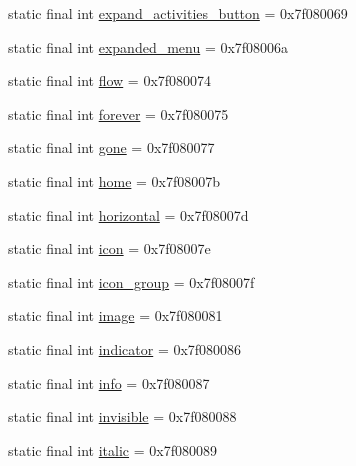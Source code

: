 \begin{DoxyCompactItemize}
\item 
static final int \mbox{\hyperlink{classcom_1_1synnapps_1_1carouselview_1_1_r_1_1id_a4d47d4d27b7335d074578066756fb00d}{expand\+\_\+activities\+\_\+button}} = 0x7f080069
\item 
static final int \mbox{\hyperlink{classcom_1_1synnapps_1_1carouselview_1_1_r_1_1id_ac9c4f64e7c18cb02dc4ba45941c9b623}{expanded\+\_\+menu}} = 0x7f08006a
\item 
static final int \mbox{\hyperlink{classcom_1_1synnapps_1_1carouselview_1_1_r_1_1id_a2fa07d38896ddef68919239827928ced}{flow}} = 0x7f080074
\item 
static final int \mbox{\hyperlink{classcom_1_1synnapps_1_1carouselview_1_1_r_1_1id_a30f5d58a35470f3a657697b440b4d1bb}{forever}} = 0x7f080075
\item 
static final int \mbox{\hyperlink{classcom_1_1synnapps_1_1carouselview_1_1_r_1_1id_a9b19a7136f32cb1525a1cabfb1a3aee2}{gone}} = 0x7f080077
\item 
static final int \mbox{\hyperlink{classcom_1_1synnapps_1_1carouselview_1_1_r_1_1id_ab6bec8184b1c5afe5d5c0dcde461e7b5}{home}} = 0x7f08007b
\item 
static final int \mbox{\hyperlink{classcom_1_1synnapps_1_1carouselview_1_1_r_1_1id_ab861d54ce3037b096e817b23cd0042d5}{horizontal}} = 0x7f08007d
\item 
static final int \mbox{\hyperlink{classcom_1_1synnapps_1_1carouselview_1_1_r_1_1id_ab3ec0640d80bfd8681719819640287bb}{icon}} = 0x7f08007e
\item 
static final int \mbox{\hyperlink{classcom_1_1synnapps_1_1carouselview_1_1_r_1_1id_a79b28693841723d9660b9c484d44eb82}{icon\+\_\+group}} = 0x7f08007f
\item 
static final int \mbox{\hyperlink{classcom_1_1synnapps_1_1carouselview_1_1_r_1_1id_a9e2275db576517b52d2f6c77a2b43f7d}{image}} = 0x7f080081
\item 
static final int \mbox{\hyperlink{classcom_1_1synnapps_1_1carouselview_1_1_r_1_1id_a9e95ec5538237b8dbd239a6d096dfd60}{indicator}} = 0x7f080086
\item 
static final int \mbox{\hyperlink{classcom_1_1synnapps_1_1carouselview_1_1_r_1_1id_adf57764d2a445740cf8f79aa37bbdbc3}{info}} = 0x7f080087
\item 
static final int \mbox{\hyperlink{classcom_1_1synnapps_1_1carouselview_1_1_r_1_1id_a4d473c1487d362165b7a7cbf9718ef2d}{invisible}} = 0x7f080088
\item 
static final int \mbox{\hyperlink{classcom_1_1synnapps_1_1carouselview_1_1_r_1_1id_a5c448f4515ae838584574be1c981b336}{italic}} = 0x7f080089

\end{DoxyCompactItemize}
